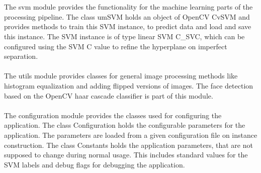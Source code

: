 \\
\\
The svm module provides the functionality for the machine learning parts of the processing pipeline. The class umSVM holds an object of OpenCV CvSVM and provides methods to train this SVM instance, to predict data and load and save this instance. The SVM instance is of type linear SVM C\_SVC, which can be configured using the SVM C value to refine the hyperplane on imperfect separation.
\\
\\
The utils module provides classes for general image processing methods like histogram equalization and adding flipped versions of images. The face detection based on the OpenCV haar cascade classifier is part of this module.
\\
\\
The configuration module provides the classes used for configuring the application. The class Configuration holds the configurable parameters for the application. The parameters are loaded from a given configuration file on instance construction. The class Constants holds the application parameters, that are not supposed to change during normal usage. This includes standard values for the SVM labels and debug flags for debugging the application.